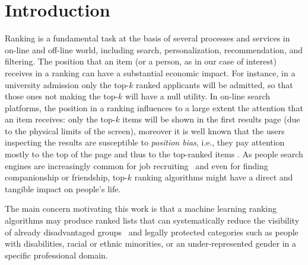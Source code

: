 \section{Introduction}\label{sec:introduction}
Ranking is a fundamental task at the basis of several processes and services in on-line and off-line world, including search, personalization, recommendation, and filtering.
%
The position that an item (or a person, as in our case of interest) receives in a ranking can have a substantial economic impact.
%
For instance, in a university admission only the top-$k$ ranked applicants will be admitted, so that those ones not making the top-$k$ will have a null utility.
%
In on-line search platforms, the position in a ranking influences to a large extent the attention that an item receives: only the top-$k$ items will be shown in the first results page (due to the physical limits of the screen), moreover it is well known that the users inspecting the results are susceptible to \emph{position bias}, i.e., they pay attention mostly to the top of the page and thus to the top-ranked items \cite{CraswellZTR08}.
%
As people search engines are increasingly common for job recruiting~\cite{raghavan2020mitigating} and even for finding companionship or friendship, top-$k$ ranking algorithms might have a direct and tangible impact on people's life.


The main concern motivating this work is that a machine learning ranking algorithms may produce ranked lists that can systematically reduce the visibility of already disadvantaged groups~\cite{peder2008,Dwork2012} and legally protected categories such as people with disabilities, racial or ethnic minorities, or an under-represented gender in a specific professional domain.
%

